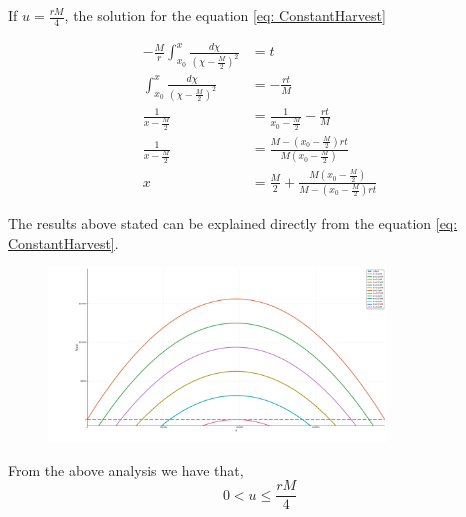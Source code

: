 If $u=\frac{rM}{4}$, the solution for the equation \ref{eq: ConstantHarvest}

\begin{align}
-\frac{M}{r}\int_{x_0}^{x}\frac{d\chi}{\left(\chi-\frac{M}{2}\right)^2}&=t\\
\int_{x_0}^{x}\frac{d\chi}{\left(\chi-\frac{M}{2}\right)^2}&=-\frac{rt}{M}\\
\frac{1}{x-\frac{M}{2}}&=\frac{1}{x_0-\frac{M}{2}}-\frac{rt}{M}\\
\frac{1}{x-\frac{M}{2}}&=\frac{M-\left(x_0-\frac{M}{2}\right)rt}{M\left(x_0-\frac{M}{2}\right)} \\
x&=\frac{M}{2}+\frac{M\left(x_0-\frac{M}{2}\right)}{M-\left(x_0-\frac{M}{2}\right)rt} 
\end{align}

The results above stated can be explained directly from the equation \ref{eq: ConstantHarvest}. 

\begin{figure}[H]
	\centering
	\includegraphics[width=0.8\textwidth]{EqulibriumPoints.png}
\end{figure}
From the above analysis we have that,
\begin{equation}
0<u\leq\frac{rM}{4}
\end{equation}

